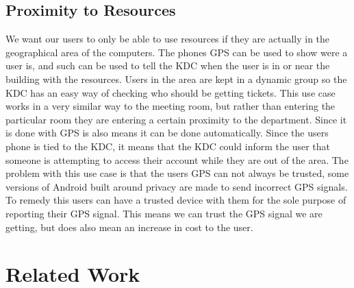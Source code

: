 \documentclass[]{report}   %
\begin{document}
\subsection{Proximity to Resources}
We want our users to only be able to use resources if they are actually in the geographical area of the computers. The phones GPS can be used to show were a user is, and such can be used to tell the KDC when the user is in or near the building with the resources. Users in the area are kept in a dynamic group so the KDC has an easy way of checking who should be getting tickets. This use case works in a very similar way to the meeting room, but rather than entering the particular room they are entering a certain proximity to the department. Since it is done with GPS is also means it can be done automatically. Since the users phone is tied to the KDC, it means that the KDC could inform the user that someone is attempting to access their account while they are out of the area. The problem with this use case is that the users GPS can not always be trusted, some versions of Android built around privacy are made to send incorrect GPS signals. To remedy this users can have a trusted device with them for the sole purpose of reporting their GPS signal. This means we can trust the GPS signal we are getting, but does also mean an increase in cost to the user.




\section{Related Work}
\end{document}

